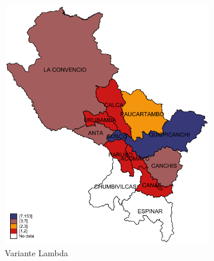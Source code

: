 \documentclass[12pt,a4paper,openany]{book}
\begin{document}
			\begin{figure}[h]
				\caption{Distribución provincial de las variantes de SARS-Cov-2 aisladas en la Región Cusco, hasta la SE 47.}
				\label{fig:mapa_variantes}
				\centering
				\begin{subfigure}[b]{0.40\textwidth}
					\centering
					\includegraphics[width=\textwidth]{../figuras/variantes_provincial_lambda.pdf}
					\caption{Variante Lambda}
				\end{subfigure}
				\hfill
				\begin{subfigure}[b]{0.40\textwidth}
					\centering

\end{subfigure}
\end{figure}
\end{document}

